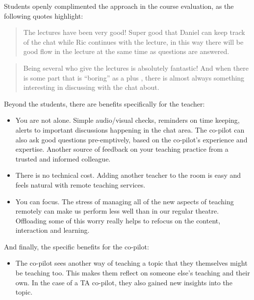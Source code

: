 \documentclass[sigconf,natbib=false]{acmart}
\begin{document}
\noindent
Students openly complimented the approach in the course evaluation, as the following quotes highlight:

\begin{quote}
The lectures have been very good! Super good that Daniel can keep track of the chat while Ric continues with the lecture, in this way there will be good flow in the lecture at the same time as questions are answered.
\end{quote}

\begin{quote}
Being several who give the lectures is absolutely fantastic! And when there is some part that is \enquote{boring} as a plus , there is almost always something interesting in discussing with the chat about.
\end{quote}

\noindent
Beyond the students, there are benefits specifically for the teacher:

\begin{itemize}
  \item You are not alone. Simple audio/visual checks, reminders on time 
    keeping, alerts to important discussions happening in the chat area. The 
    co-pilot can also ask good questions pre-emptively, based on the co-pilot's 
    experience and expertise. Another source of feedback on your teaching 
    practice from a trusted and informed colleague.

  \item There is no technical cost. Adding another teacher to the room is easy and feels natural with remote teaching services.

  \item You can focus. The stress of managing all of the new aspects of teaching remotely can make us perform less well than in our regular theatre. Offloading some of this worry really helps to refocus on the content, interaction and learning.
\end{itemize}

\noindent
And finally, the specific benefits for the co-pilot:

\begin{itemize}
  \item The co-pilot sees another way of teaching a topic that they themselves might be teaching too. This makes them reflect on someone else's teaching and their own. In the case of a TA co-pilot, they also gained new insights into the topic.
\end{itemize}
\end{document}

